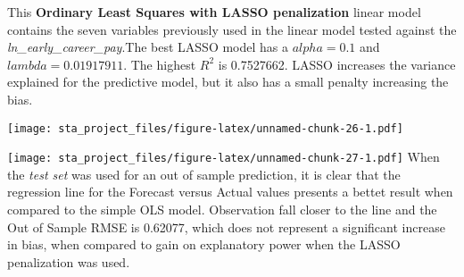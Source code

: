 \documentclass[
]{article}
\begin{document}
This \textbf{Ordinary Least Squares with LASSO penalization} linear
model contains the seven variables previously used in the linear model
tested against the \emph{ln\_early\_career\_pay}.The best LASSO model
has a \(alpha=0.1\) and \(lambda=0.01917911\). The highest \(R^2\) is
0.7527662. LASSO increases the variance explained for the predictive
model, but it also has a small penalty increasing the bias.

\texttt{[image: sta\_project\_files/figure-latex/unnamed-chunk-26-1.pdf]}

\texttt{[image: sta\_project\_files/figure-latex/unnamed-chunk-27-1.pdf]}
When the \emph{test set} was used for an out of sample prediction, it is
clear that the regression line for the Forecast versus Actual values
presents a bettet result when compared to the simple OLS model.
Observation fall closer to the line and the Out of Sample RMSE is
0.62077, which does not represent a significant increase in bias, when
compared to gain on explanatory power when the LASSO penalization was
used.
\end{document}
